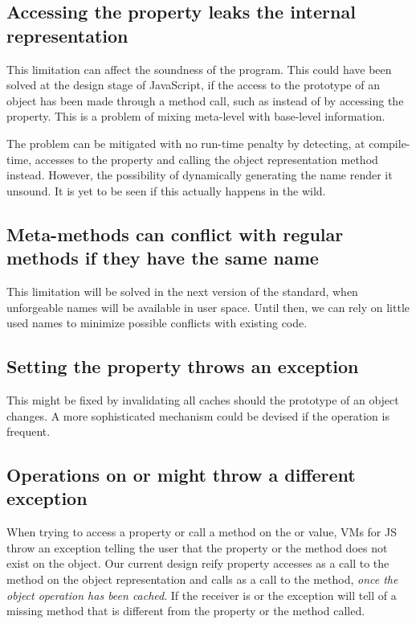 \subsection{Accessing the  property leaks the internal representation}

This limitation can affect the soundness of the program. This could have been
solved at the design stage of JavaScript, if the access to the prototype of an
object has been made through a method call, such as  instead
of by accessing the  property. This is a problem of mixing
meta-level with base-level information.

The problem can be mitigated with no run-time penalty by detecting, at
compile-time, accesses to the  property and calling the object
representation  method instead. However, the possibility of
dynamically generating the  name render it unsound. It
is yet to be seen if this actually happens in the wild.

\subsection{Meta-methods can conflict with regular methods if they have the same name}

This limitation will be solved in the next version of the standard, when
unforgeable names will be available in user space.  Until then, we can rely on
little used names to minimize possible conflicts with existing code.

\subsection{Setting the  property throws an exception}

This might be fixed by invalidating all caches should the prototype of an
object changes. A more sophisticated mechanism could be devised if the operation
is frequent.

\subsection{Operations on  or  might throw a different exception}

When trying to access a property or call a method on the  or
 value, VMs for JS throw an exception telling the user that the
property or the method does not exist on the object. Our current design reify
property accesses as a call to the  method on the object representation
and calls as a call to the  method, \textit{once the object operation
has been cached}. If the receiver is  or  the exception
will tell of a missing method that is different from the property or the method
called.

